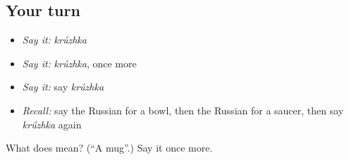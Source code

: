 \subsection*{Your turn}
\begin{itemize}
\raggedright
  \item \emph{Say it:} \emph{krúzhka}
  \item \emph{Say it:} \emph{krúzhka}, once more
  \item \emph{Say it:} say \emph{krúzhka}
  \item \emph{Recall:} say the Russian for a bowl, then the Russian for a saucer, then say \emph{krúzhka} again
\end{itemize}

\begin{tcolorbox}[breakable,colback=teal!4,colframe=teal!35!black,title={Before you move on}]
What does  mean? (\textquotedblleft{}A mug\textquotedblright{}.) Say it once more.
\end{tcolorbox}
